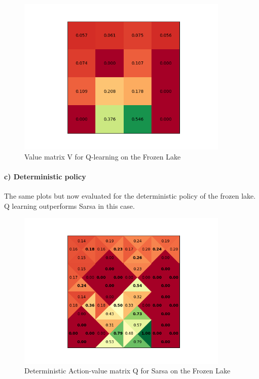 \documentclass{article}
\begin{document}
\begin{figure}[H]
\centering
\includegraphics[width=0.9\textwidth]{figures/V_q_slippery.png}
\caption{Value matrix V for Q-learning on the Frozen Lake}
\label{fig:V_q}
\end{figure}



\paragraph*{c) Deterministic policy}

The same plots but now evaluated for the deterministic policy of the frozen lake. Q learning outperforms Sarsa in this case.

\begin{figure}[H]
\centering
\includegraphics[width=0.9\textwidth]{figures/Q_sarsa_det.png}
\caption{Deterministic Action-value matrix Q for Sarsa on the Frozen Lake}
\label{fig:Q_sarsa_det}
\end{figure}
\end{document}
